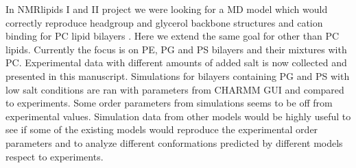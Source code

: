 \documentclass[aps,prl,superscriptaddress,twocolumn]{revtex4}
\begin{document}
In NMRlipids I and II project we were looking for a MD model
which would correctly reproduce headgroup and glycerol
backbone structures and cation binding for PC lipid bilayers \cite{botan15,catte16}.
Here we extend the same goal for other than PC lipids.
Currently the focus is on PE, PG and PS bilayers and their
mixtures with PC. Experimental data with different amounts of 
added salt is now collected and presented in this manuscript.
Simulations for bilayers containing PG and PS with low salt conditions
are ran with parameters from CHARMM GUI
and compared to experiments. Some order parameters from
simulations seems to be off from experimental values.
Simulation data from other models would be highly useful 
to see if some of the existing models would reproduce the 
experimental order parameters and to analyze different 
conformations predicted by different models respect to 
experiments.



\end{document}
